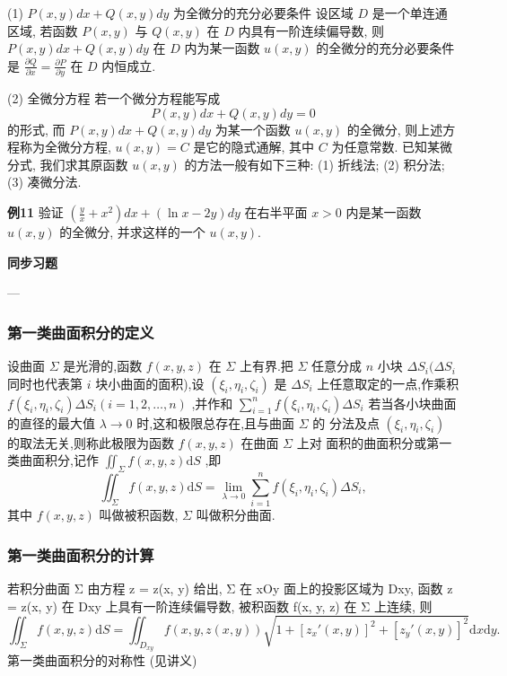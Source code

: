 (1) \(P(x,y)dx + Q(x,y)dy\) 为全微分的充分必要条件 设区域 \(D\) 是一个单连通区域, 若函数 \(P(x,y)\) 与 \(Q(x,y)\) 在 \(D\) 内具有一阶连续偏导数, 则 \(P(x,y)dx + Q(x,y)dy\) 在 \(D\) 内为某一函数 \(u(x,y)\) 的全微分的充分必要条件是 \(\frac{\partial Q}{\partial x} = \frac{\partial P}{\partial y}\) 在 \(D\) 内恒成立.

(2) 全微分方程 若一个微分方程能写成
\[P(x,y)dx + Q(x,y)dy = 0\]
的形式, 而 \(P(x,y)dx + Q(x,y)dy\) 为某一个函数 \(u(x,y)\) 的全微分, 则上述方程称为全微分方程, \(u(x,y) = C\) 是它的隐式通解, 其中 \(C\) 为任意常数.
已知某微分式, 我们求其原函数 \(u(x,y)\) 的方法一般有如下三种:
(1) 折线法; (2) 积分法; (3) 凑微分法.

\textbf{例11}
验证 \((\frac{y}{x} + x^2) dx + (\ln x - 2y) dy\) 在右半平面 \(x > 0\) 内是某一函数 \(u(x, y)\) 的全微分, 并求这样的一个 \(u(x, y)\).


\medskip
\textbf{同步习题}
\medskip

---


\subsubsection*{第一类曲面积分的定义}


设曲面 \(\Sigma\) 是光滑的,函数 \(f(x,y,z)\) 在 \(\Sigma\) 上有界.把 \(\Sigma\) 任意分成 \(n\) 小块 \(\Delta S_{i}(\Delta S_{i}\) 同时也代表第 \(i\) 块小曲面的面积),设 \((\xi_{i},\eta_{i},\zeta_{i})\) 是 \(\Delta S_{i}\) 上任意取定的一点,作乘积 \(f(\xi_{i},\eta_{i},\zeta_{i})\Delta S_{i}(i = 1,2,\dots ,n)\) ,并作和 \(\sum_{i = 1}^{n}f(\xi_{i},\eta_{i},\zeta_{i})\Delta S_{i}\) 若当各小块曲面的直径的最大值 \(\lambda \rightarrow 0\) 时,这和极限总存在,且与曲面 \(\Sigma\) 的 分法及点 \((\xi_{i},\eta_{i},\zeta_{i})\) 的取法无关,则称此极限为函数 \(f(x,y,z)\) 在曲面 \(\Sigma\) 上对 面积的曲面积分或第一类曲面积分,记作 \(\iint_{\Sigma}f(x,y,z)\mathrm{d}S\) ,即
\[\iint_{\Sigma}f(x,y,z)\mathrm{d}S = \lim_{\lambda \to 0}\sum_{i = 1}^{n}f(\xi_{i},\eta_{i},\zeta_{i})\Delta S_{i},\]
其中 \(f(x,y,z)\) 叫做被积函数, \(\Sigma\) 叫做积分曲面.


\subsubsection*{第一类曲面积分的计算}


若积分曲面 Σ 由方程 z = z(x, y) 给出, Σ 在 xOy 面上的投影区域为 Dxy, 函数 z = z(x, y) 在 Dxy 上具有一阶连续偏导数, 被积函数 f(x, y, z) 在 Σ 上连续, 则
\[ \iint_{\Sigma} f(x, y, z) \mathrm{d}S = \iint_{D_{xy}} f(x, y, z(x, y)) \sqrt{1 + [z_x'(x, y)]^2 + [z_y'(x, y)]^2} \mathrm{d}x \mathrm{d}y. \]
第一类曲面积分的对称性 (见讲义)

